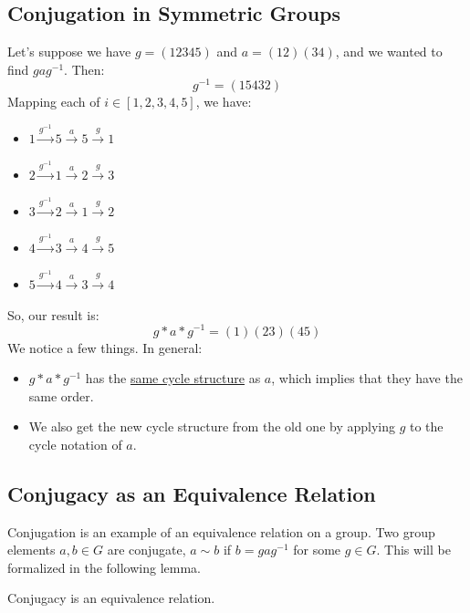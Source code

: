 \documentclass[letterpaper]{article}
\begin{document}
\subsection{Conjugation in Symmetric Groups}
Let's suppose we have $g = (12345)$ and $a = (12)(34)$, and we wanted to find $gag^{-1}$. Then: 
\[g^{-1} = (15432)\]
Mapping each of $i \in [1, 2, 3, 4, 5]$, we have: 
\begin{itemize}
    \item $1 \xrightarrow{g^{-1}} 5 \xrightarrow{a} 5 \xrightarrow{g} 1$
    \item $2 \xrightarrow{g^{-1}} 1 \xrightarrow{a} 2 \xrightarrow{g} 3$
    \item $3 \xrightarrow{g^{-1}} 2 \xrightarrow{a} 1 \xrightarrow{g} 2$
    \item $4 \xrightarrow{g^{-1}} 3 \xrightarrow{a} 4 \xrightarrow{g} 5$
    \item $5 \xrightarrow{g^{-1}} 4 \xrightarrow{a} 3 \xrightarrow{g} 4$
\end{itemize}
So, our result is: 
\[g * a * g^{-1} = (1)(23)(45)\]
We notice a few things. In general:  
\begin{itemize}
    \item $g * a * g^{-1}$ has the \underline{same cycle structure} as $a$, which implies that they have the same order. 
    \item We also get the new cycle structure from the old one by applying $g$ to the cycle notation of $a$. 
\end{itemize}

\subsection{Conjugacy as an Equivalence Relation}
Conjugation is an example of an equivalence relation on a group. Two group elements $a, b \in G$ are conjugate, $a \sim b$ if $b = gag^{-1}$ for some $g \in G$. This will be formalized in the following lemma. 
\begin{lemma}{}{}
    Conjugacy is an equivalence relation. 
\end{lemma}
\end{document}
